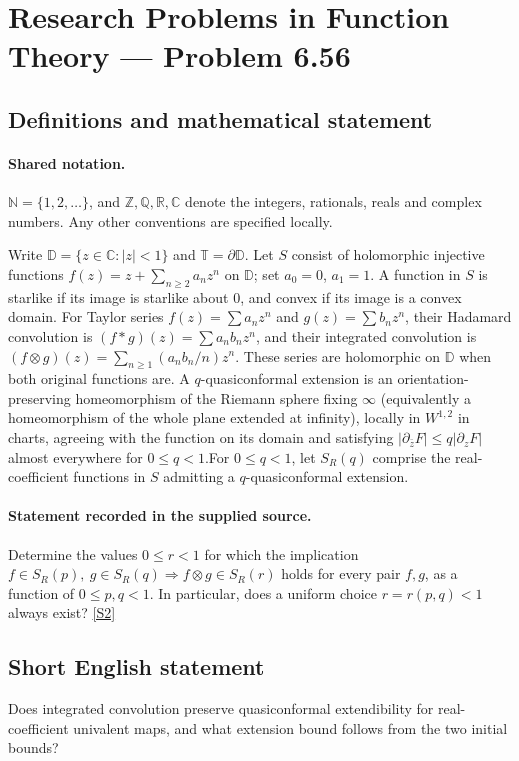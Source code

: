 \documentclass[11pt]{article}
\newcommand{\sref}[2]{\hyperlink{source:#1:#2}{[S#2]}}
\begin{document}
\section{Research Problems in Function Theory — Problem 6.56}\label{statement}

\subsection{Definitions and mathematical statement}

\paragraph{Shared notation.}$\mathbb N=\{1,2,\ldots\}$, and $\mathbb Z,\mathbb Q,\mathbb R,\mathbb C$ denote the integers, rationals, reals and complex numbers. Any other conventions are specified locally.


Write $\mathbb D=\{z\in\mathbb C:|z|<1\}$ and $\mathbb T=\partial\mathbb D$. Let $S$ consist of holomorphic injective functions $f(z)=z+\sum_{n\ge2}a_nz^n$ on $\mathbb D$; set $a_0=0$, $a_1=1$. A function in $S$ is starlike if its image is starlike about $0$, and convex if its image is a convex domain. For Taylor series $f(z)=\sum a_nz^n$ and $g(z)=\sum b_nz^n$, their Hadamard convolution is $(f*g)(z)=\sum a_nb_nz^n$, and their integrated convolution is $(f\otimes g)(z)=\sum_{n\ge1}(a_nb_n/n)z^n$. These series are holomorphic on $\mathbb D$ when both original functions are. A $q$-quasiconformal extension is an orientation-preserving homeomorphism of the Riemann sphere fixing $\infty$ (equivalently a homeomorphism of the whole plane extended at infinity), locally in $W^{1,2}$ in charts, agreeing with the function on its domain and satisfying $|\partial_{\bar z}F|\le q|\partial_zF|$ almost everywhere for $0\le q<1$.For $0\le q<1$, let $S_R(q)$ comprise the real-coefficient functions in $S$ admitting a $q$-quasiconformal extension.
\paragraph{Statement recorded in the supplied source.}
Determine the values $0\le r<1$ for which the implication $f\in S_R(p),\ g\in S_R(q)\Longrightarrow f\otimes g\in S_R(r)$ holds for every pair $f,g$, as a function of $0\le p,q<1$. In particular, does a uniform choice $r=r(p,q)<1$ always exist? \sref{statement}{2}
\subsection{Short English statement}
Does integrated convolution preserve quasiconformal extendibility for real-coefficient univalent maps, and what extension bound follows from the two initial bounds?
\end{document}
